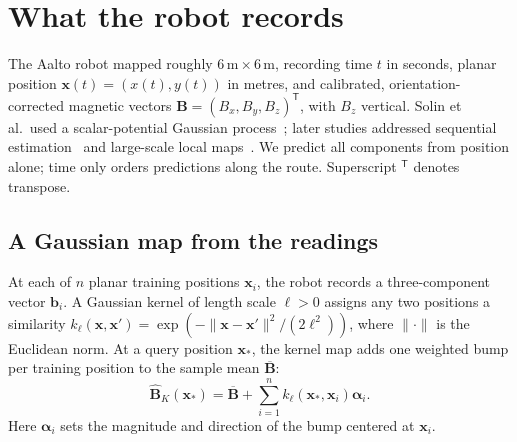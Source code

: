 \documentclass[11pt]{article}
\newcommand{\B}{\mathbf B}
\newcommand{\x}{\mathbf x}
\newcommand{\bvec}{\mathbf b}
\begin{document}
\section{What the robot records}

The Aalto robot mapped roughly \(6\,\mathrm m\times6\,\mathrm m\), recording
time \(t\) in seconds, planar position \(\x(t)=(x(t),y(t))\) in metres, and
calibrated, orientation-corrected magnetic vectors
\(\B=(B_x,B_y,B_z)^{\mathsf T}\), with \(B_z\) vertical.
Solin et al.\ used a scalar-potential Gaussian process~\cite{solin}; later
studies addressed sequential estimation~\cite{chang} and large-scale local
maps~\cite{abdulraouf}. We predict all components from position alone;
time only orders predictions along the route. Superscript \({}^{\mathsf T}\)
denotes transpose.

\subsection{A Gaussian map from the readings}

At each of \(n\) planar training positions \(\x_i\), the robot records a
three-component vector \(\bvec_i\). A Gaussian kernel of length scale
\(\ell>0\) assigns any two positions a similarity
\(k_\ell(\x,\x')=\exp(-\|\x-\x'\|^2/(2\ell^2))\), where \(\|\cdot\|\)
is the Euclidean norm. At a query position \(\x_*\), the kernel map adds one
weighted bump per training position to the sample mean \(\overline{\B}\):
\begin{equation}
 \widehat{\B}_K(\x_*)=\overline{\B}+
 \sum_{i=1}^{n} k_\ell(\x_*,\x_i)\boldsymbol\alpha_i .
 \label{eq:gaussian_response}
\end{equation}
Here \(\boldsymbol\alpha_i\) sets the magnitude and direction of the bump
centered at \(\x_i\).
\end{document}
